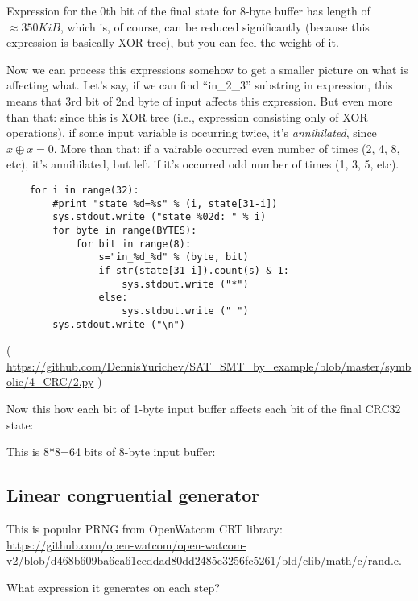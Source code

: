 Expression for the 0th bit of the final state for 8-byte buffer has length of $\approx 350KiB$,
which is, of course, can be reduced
significantly (because this expression is basically XOR tree), but you can feel the weight of it.

Now we can process this expressions somehow to get a smaller picture on what is affecting what.
Let's say, if we can find ``in\_2\_3'' substring in expression, this means that 3rd bit of 2nd byte of input
affects this expression.
But even more than that: since this is XOR tree (i.e., expression consisting only of XOR operations),
if some input variable is occurring twice, it's \textit{annihilated}, since $x \oplus x=0$.
More than that: if a vairable occurred even number of times (2, 4, 8, etc), it's annihilated, but left if it's occurred
odd number of times (1, 3, 5, etc).

\begin{lstlisting}
    for i in range(32):
        #print "state %d=%s" % (i, state[31-i])
        sys.stdout.write ("state %02d: " % i)
        for byte in range(BYTES):
            for bit in range(8):
                s="in_%d_%d" % (byte, bit)
                if str(state[31-i]).count(s) & 1:
                    sys.stdout.write ("*")
                else:
                    sys.stdout.write (" ")
        sys.stdout.write ("\n")
\end{lstlisting}

( \url{https://github.com/DennisYurichev/SAT_SMT_by_example/blob/master/symbolic/4_CRC/2.py} )

Now this how each bit of 1-byte input buffer affects each bit of the final CRC32 state:



This is 8*8=64 bits of 8-byte input buffer:



\subsection{Linear congruential generator}

This is popular \ac{PRNG} from OpenWatcom \ac{CRT} library: \url{https://github.com/open-watcom/open-watcom-v2/blob/d468b609ba6ca61eeddad80dd2485e3256fc5261/bld/clib/math/c/rand.c}.

What expression it generates on each step?



